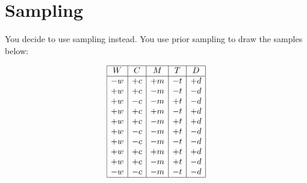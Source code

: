 \documentclass[12pt]{article}
\begin{document}
\clearpage

\section{Sampling}

You decide to use sampling instead.  You use prior sampling to draw
the samples below:

$$\begin{array}{|c|c|c|c|c|} \hline
W  & C  & M  & T  & D  \\ \hline
-w & +c & +m & -t & +d \\
+w & +c & -m & -t & -d \\
+w & -c & -m & +t & -d \\
+w & +c & +m & -t & +d \\
+w & +c & -m & +t & +d \\
+w & -c & -m & +t & -d \\
+w & -c & -m & -t & -d \\
+w & +c & +m & +t & +d \\
+w & +c & -m & +t & -d \\
-w & -c & -m & -t & -d \\ \hline
\end{array}$$
\end{document}
